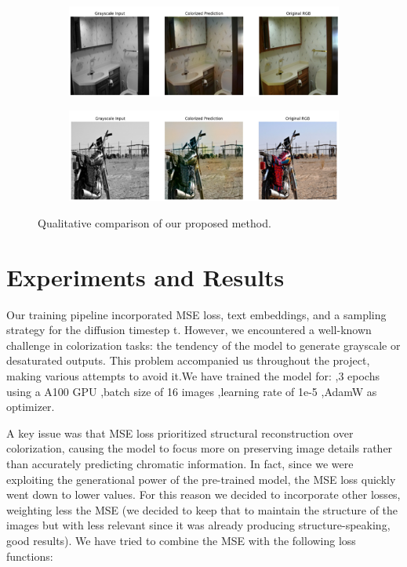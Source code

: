 \documentclass[10pt,twocolumn,letterpaper]{article}
\begin{document}
\begin{figure}[h]
\centering
\begin{subfigure}
  \centering
  \includegraphics[width=1\textwidth]{results.png}
\end{subfigure}
\vspace{2mm}
\begin{subfigure}
  \centering
  \includegraphics[width=1\textwidth]{results2.png}
\end{subfigure}
\caption{Qualitative comparison of our proposed method.}
\label{fig:results}
\end{figure}

\section{Experiments and Results}
Our training pipeline incorporated MSE loss, text embeddings, and a sampling strategy for the diffusion timestep t. However, we encountered a well-known challenge in colorization tasks: the tendency of the model to generate grayscale or desaturated outputs. This problem accompanied us throughout the project, making various attempts to avoid it.We have trained the model for:
,3 epochs using a A100 GPU
,batch size of 16 images
,learning rate of 1e-5
,AdamW as optimizer.


A key issue was that MSE loss prioritized structural reconstruction over colorization, causing the model to focus more on preserving image details rather than accurately predicting chromatic information. In fact, since we were exploiting the generational power of the pre-trained model, the MSE loss quickly went down to lower values. For this reason we decided to incorporate other losses, weighting less the MSE (we decided to keep that to maintain the structure of the images but with less relevant since it was already producing structure-speaking, good results). We have tried to combine the MSE with the following loss functions:
\end{document}
